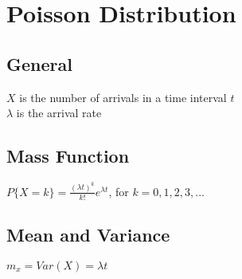 \section*{Poisson Distribution}

\subsection*{General}
$X$ is the number of arrivals in a time interval $t$ \\
$\lambda$ is the arrival rate

\subsection*{Mass Function}
$P\{X=k\}=\frac{(\lambda t)^k}{k!}e^{\lambda t}$, for $k=0,1,2,3,...$

\subsection*{Mean and Variance}
$m_x= Var(X) = \lambda t$
    

